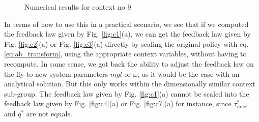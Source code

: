 \begin{figure}[htp]
    \centering
    \vspace{-10pt}
    \caption{Numerical results for context no 9}
    \label{fig:c9}
\end{figure}

In terms of how to use this in a practical scenario, we see that if we computed the feedback law given by Fig. \ref{fig:c1}(a), we can get the feedback law given by Fig. \ref{fig:c2}(a) or Fig. \ref{fig:c3}(a) directly by scaling the original policy with eq. \eqref{eq:ab_transform}, using the appropriate context variables, without having to recompute. In some sense, we got back the ability to adjust the feedback law on the fly to new system parameters $mgl$ or $\omega$, as it would be the case with an analytical solution. But this only works within the dimensionally similar context sub-group. The feedback law given by Fig. \ref{fig:c1}(a) cannot be scaled into the feedback law given by Fig. \ref{fig:c4}(a) or Fig. \ref{fig:c7}(a) for instance, since $\tau^*_{max}$ and $q^*$ are not equals. 

